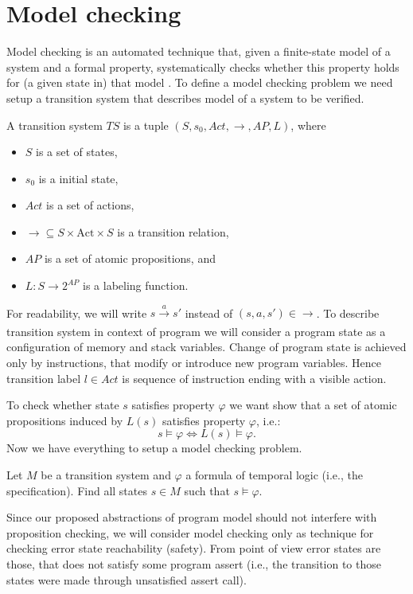 \section{Model checking} \label{sec:mc}
Model checking is an automated technique that, given a finite-state model of a
system and a formal property, systematically checks whether this property holds
for (a given state in) that model \cite{Baier08}. To define a model checking problem
we need setup a transition system that describes model of a system to be
verified.
\begin{definition}\label{def:ts}
A transition system $TS$ is a tuple $(S, s_0, Act, \longrightarrow, AP, L)$, where
\begin{itemize}
    \setlength\itemsep{0.7em}
    \item $S$ is a set of states,
    \item $s_0$ is a initial state,
    \item $Act$ is a set of actions,
    \item $\longrightarrow \subseteq S \times \mathrm{Act} \times S$ is a
    transition relation,
    \item $AP$ is a set of atomic propositions, and
    \item $L: S \rightarrow 2^{AP}$ is a labeling function.
\end{itemize}
\end{definition}
\noindent
For readability, we will write $s \xrightarrow[]{a} s'$ instead of $(s, a, s') \in
\longrightarrow$. To describe transition system in context of \LLVM program we
will consider a program state as a configuration of memory and stack variables.
Change of program state is achieved only by instructions, that modify or
introduce new program variables. Hence transition label $l \in Act$ is sequence
of \LLVM instruction ending with a visible action.

To check whether state $s$ satisfies property $\varphi$ we want show that a set of
atomic propositions induced by $L(s)$ satisfies property $\varphi$, i.e.:
$$ s \models \varphi \iff L(s) \models \varphi.$$
Now we have everything to setup a model checking problem.

\begin{definition}\label{def:mc}
Let $M$ be a transition system and $\varphi$ a
formula of temporal logic (i.e., the specification). Find all states $s \in M$
such that $s \models \varphi$.
\end{definition}

Since our proposed abstractions of program model should not interfere
with proposition checking, we will consider model checking only as technique for
checking error state reachability (safety). From \LLVM point of view error states are
those, that does not satisfy some program assert (i.e., the transition to
those states were made through unsatisfied assert call).

